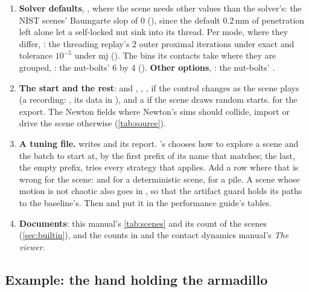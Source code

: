 \begin{enumerate}
\item \textbf{Solver defaults}, , where the scene needs other values than the solver's: the NIST scenes' Baumgarte slop of 0 (), since the default 0.2\,mm of penetration left alone let a self-locked nut sink into its thread. Per mode, where they differ, : the threading replay's 2 outer proximal iterations under exact and tolerance $10^{-5}$ under mj (). The bins its contacts take where they are grouped, : the nut-bolts' 6 by 4 (). \textbf{Other  options}, : the nut-bolts' .
\item \textbf{The start and the rest}:  and , , ,  if the control changes as the scene plays (a recording: , its data in ), and a  if the scene draws random starts.  for the export. The Newton fields where Newton's sims should collide, import or drive the scene otherwise (\cref{tab:source}).
\item \textbf{A tuning file.}  writes  and its report. 's  chooses how to explore a scene and the batch to start at, by the first prefix of its name that matches; the last, the empty prefix, tries every strategy that applies. Add a row where that is wrong for the scene:  and  for a deterministic scene,  for a pile. A scene whose motion is not chaotic also goes in , so that the artifact guard holds its paths to the baseline's. Then  and  put it in the performance guide's tables.
\item \textbf{Documents}: this manual's \cref{tab:scenes} and its count of the scenes (\cref{sec:builtin}), and the counts in  and the contact dynamics manual's \emph{The viewer}.
\end{enumerate}

\subsection{Example: the hand holding the armadillo}\label{sec:exhand}

